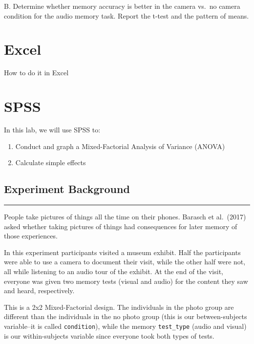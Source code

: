 \documentclass[
]{book}
\providecommand{\tightlist}{%
  \setlength{\itemsep}{0pt}\setlength{\parskip}{0pt}}
\begin{document}
B. Determine whether memory accuracy is better in the camera vs.~no camera condition for the audio memory task. Report the t-test and the pattern of means.

\hypertarget{excel-10}{%
\section{Excel}\label{excel-10}}

How to do it in Excel

\hypertarget{spss-10}{%
\section{SPSS}\label{spss-10}}

In this lab, we will use SPSS to:

\begin{enumerate}
\def\labelenumi{\arabic{enumi}.}
\tightlist
\item
  Conduct and graph a Mixed-Factorial Analysis of Variance (ANOVA)
\item
  Calculate simple effects
\end{enumerate}

\hypertarget{experiment-background-8}{%
\subsection{Experiment Background}\label{experiment-background-8}}

\begin{center}\rule{0.5\linewidth}{0.5pt}\end{center}

People take pictures of things all the time on their phones. Barasch et al.~(2017) asked whether taking pictures of things had consequences for later memory of those experiences.

In this experiment participants visited a museum exhibit. Half the participants were able to use a camera to document their visit, while the other half were not, all while listening to an audio tour of the exhibit. At the end of the visit, everyone was given two memory tests (visual and audio) for the content they saw and heard, respectively.

This is a 2x2 Mixed-Factorial design. The individuals in the photo group are different than the individuals in the no photo group (this is our between-subjects variable--it is called \texttt{condition}), while the memory \texttt{test\_type} (audio and visual) is our within-subjects variable since everyone took both types of tests.
\end{document}
